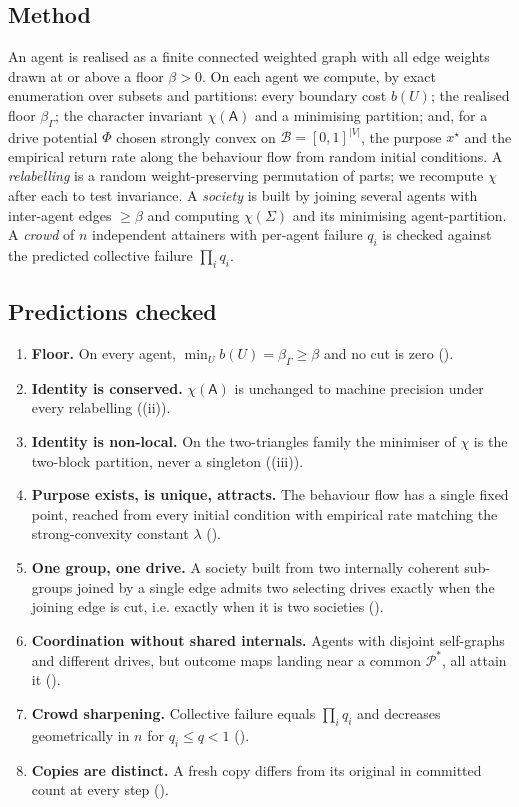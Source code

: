 \documentclass[11pt,twocolumn,a4paper]{article}
\newcommand{\Agent}{\mathsf{A}}
\newcommand{\Self}{\Gamma}          %
\newcommand{\V}{V}
\newcommand{\floorc}{\beta}          %
\newcommand{\Char}{\chi}             %
\newcommand{\Beh}{\mathcal{B}}       %
\newcommand{\Purp}{\mathcal{P}}      %
\newcommand{\Soc}{\Sigma}            %
\newcommand{\abs}[1]{\lvert#1\rvert}
\begin{document}
\subsection{Method}

An agent is realised as a finite connected weighted graph with all edge
weights drawn at or above a floor $\floorc>0$. On each agent we compute,
by exact enumeration over subsets and partitions: every boundary cost
$b(U)$; the realised floor $\floorc_\Self$; the character invariant
$\Char(\Agent)$ and a minimising partition; and, for a drive potential
$\Phi$ chosen strongly convex on $\Beh=[0,1]^{\abs\V}$, the purpose
$x^\star$ and the empirical return rate along the behaviour flow from
random initial conditions. A \emph{relabelling} is a random
weight-preserving permutation of parts; we recompute $\Char$ after each to
test invariance. A \emph{society} is built by joining several agents with
inter-agent edges $\ge\floorc$ and computing $\Char(\Soc)$ and its
minimising agent-partition. A \emph{crowd} of $n$ independent attainers
with per-agent failure $q_i$ is checked against the predicted collective
failure $\prod_i q_i$.

\subsection{Predictions checked}

\begin{enumerate}[label=\textbf{(V\arabic*)},leftmargin=*]
\item \textbf{Floor.} On every agent, $\min_U b(U)=\floorc_\Self\ge\floorc$
and no cut is zero ().
\item \textbf{Identity is conserved.} $\Char(\Agent)$ is unchanged to
machine precision under every relabelling ((ii)).
\item \textbf{Identity is non-local.} On the two-triangles family the
minimiser of $\Char$ is the two-block partition, never a singleton
((iii)).
\item \textbf{Purpose exists, is unique, attracts.} The behaviour flow has
a single fixed point, reached from every initial condition with empirical
rate matching the strong-convexity constant $\lambda$
().
\item \textbf{One group, one drive.} A society built from two internally
coherent sub-groups joined by a single edge admits two selecting drives
exactly when the joining edge is cut, i.e. exactly when it is two
societies ().
\item \textbf{Coordination without shared internals.} Agents with disjoint
self-graphs and different drives, but outcome maps landing near a common
$\Purp^\ast$, all attain it ().
\item \textbf{Crowd sharpening.} Collective failure equals $\prod_i q_i$
and decreases geometrically in $n$ for $q_i\le q<1$ ().
\item \textbf{Copies are distinct.} A fresh copy differs from its original
in committed count at every step ().
\end{enumerate}
\end{document}
